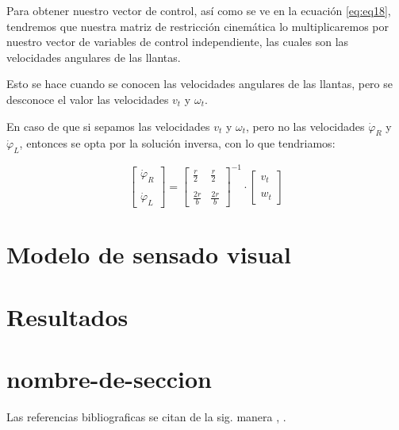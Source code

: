 \documentclass[spanish,10pt,letterpaper, twocolumn]{article}
\begin{document}
Para obtener nuestro vector de control, as\'i como se ve en la ecuaci\'on \eqref{eq:eq18}, tendremos que nuestra matriz de restricci\'on cinem\'atica lo multiplicaremos por nuestro vector de variables de control independiente, las cuales son las velocidades angulares de las llantas. 

Esto se hace cuando se conocen las velocidades angulares de las llantas, pero se desconoce el valor las velocidades $v_t$ y $\omega_t$. 

En caso de que si sepamos las velocidades $v_t$ y $\omega_t$, pero no las velocidades $\dot{\varphi}_R$ y $\dot{\varphi}_L$, entonces se opta por la soluci\'on inversa, con lo que tendriamos:

\begin{equation}
	\label{eq:eq19}
	\begin{bmatrix}
		\dot{\varphi}_R \\ \\
		\dot{\varphi}_L
	\end{bmatrix}
	=
	\begin{bmatrix}
		\frac{r}{2} & \frac{r}{2} \\ \\
		\frac{2r}{b} & \frac{2r}{b}
	\end{bmatrix}^{-1}
	\cdot
	\begin{bmatrix}
		v_t \\ \\
		w_t
	\end{bmatrix}
\end{equation} 

 


\section{Modelo de sensado visual}

\section{Resultados}


\section{nombre-de-seccion}
Las referencias bibliograficas se citan de la sig. manera \cite{clave1}, \cite{clave2, clave3}. 


\end{document}
